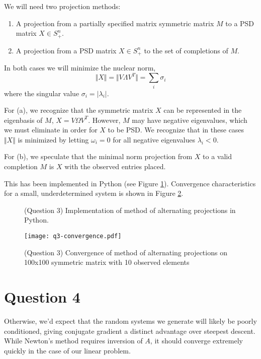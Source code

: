 \documentclass{article}
\begin{document}
We will need two projection methods:

\begin{enumerate}
\item A projection from a partially specified matrix symmetric matrix $M$
  to a PSD matrix $X \in S_+^n$.
\item A projection from a PSD matrix $X \in S_+^n$ to the set of
  completions of $M$.
\end{enumerate}

In both cases we will minimize the nuclear norm,
\[ \Vert X \Vert = \Vert V \Lambda V^T \Vert = \sum_i \sigma_i \]
where the singular value $\sigma_i = \vert \lambda_i \vert$.

For (a), we recognize that the symmetric matrix $X$ can be represented
in the eigenbasis of $M$, $X = V \Omega V^T$. However, $M$ may have
negative eigenvalues, which we must eliminate in order for $X$ to be
PSD. We recognize that in these cases $\Vert X \Vert$ is minimized by
letting $\omega_i = 0$ for all negative eigenvalues $\lambda_i <
0$.

For (b), we speculate that the minimal norm projection from $X$ to a
valid completion $M$ is $X$ with the observed entries placed.

This has been implemented in Python (see Figure
\ref{Fig:AltProj}). Convergence characteristics for a small,
underdetermined system is shown in Figure \ref{Fig:AltProjConv}.

\begin{figure}
  
  \caption{(Question 3) Implementation of method of alternating projections in Python.}
  \label{Fig:AltProj}
\end{figure}

\begin{figure}
  \center
  \texttt{[image: q3-convergence.pdf]}
  \caption{(Question 3) Convergence of method of alternating projections on 100x100
  symmetric matrix with 10 observed elements}
  \label{Fig:AltProjConv}
\end{figure}

\section{Question 4}

Otherwise, we'd expect that the random systems we generate will likely
be poorly conditioned, giving conjugate gradient a distinct advantage
over steepest descent. While Newton's method requires inversion of $A$,
it should converge extremely quickly in the case of our linear problem.
\end{document}
